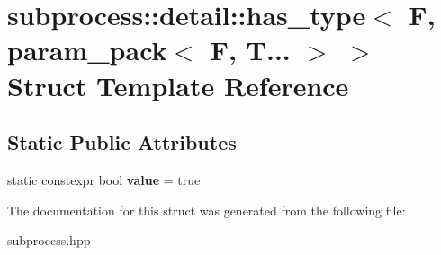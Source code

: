 \hypertarget{structsubprocess_1_1detail_1_1has__type_3_01F_00_01param__pack_3_01F_00_01T_8_8_8_01_4_01_4}{}\section{subprocess\+:\+:detail\+:\+:has\+\_\+type$<$ F, param\+\_\+pack$<$ F, T... $>$ $>$ Struct Template Reference}
\label{structsubprocess_1_1detail_1_1has__type_3_01F_00_01param__pack_3_01F_00_01T_8_8_8_01_4_01_4}
\subsection*{Static Public Attributes}
\begin{DoxyCompactItemize}
\item 
\mbox{\label{structsubprocess_1_1detail_1_1has__type_3_01F_00_01param__pack_3_01F_00_01T_8_8_8_01_4_01_4_a81c6a55c1a881c07a41b0756750ebf83}} 
static constexpr bool {\bfseries value} = true
\end{DoxyCompactItemize}


The documentation for this struct was generated from the following file\+:\begin{DoxyCompactItemize}
\item 
subprocess.\+hpp\end{DoxyCompactItemize}
